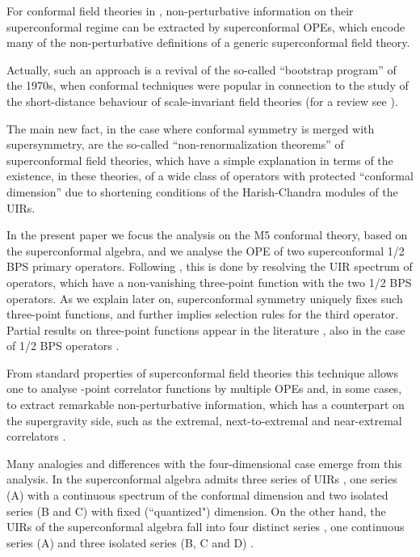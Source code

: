 \documentclass[a4paper,11pt]{article}
\begin{document}
For conformal field theories in \coordHE{}, non-perturbative information on
their superconformal regime can be extracted by superconformal OPEs,
which encode many of the non-perturbative definitions of a generic
superconformal field theory.

Actually, such an approach is a revival of the so-called ``bootstrap program''
of the 1970s, when conformal techniques were popular in connection to the study
of the short-distance behaviour of scale-invariant field theories (for a review
see \cite{Pisa}).

The main new fact, in the case where conformal symmetry is merged with
supersymmetry, are the so-called ``non-renormalization theorems'' of
superconformal field theories, which have a simple explanation in terms of the
existence, in these theories, of a wide class of operators with protected
``conformal dimension'' due to shortening conditions \cite{FF,dp,Minw2} of
the Harish-Chandra modules \cite{HCh,FeFo} of the UIRs.

In the present paper we focus the analysis on the M5 \coordHE{}
conformal theory, based on the \coordHE{}
superconformal algebra, and we analyse the OPE of two
superconformal 1/2 BPS primary operators. Following \cite{AES,ES},
this is done by resolving the UIR spectrum of operators, which
have a non-vanishing three-point function with the two 1/2 BPS
operators. As we explain later on, superconformal symmetry
uniquely fixes such three-point functions, and further implies
selection rules for the third operator. Partial results on \coordHE{}  \coordHE{} three-point functions appear in the literature \cite{P6},
also in the case of 1/2 BPS operators \cite{DHref38}.

{}From standard properties of superconformal field theories this
technique allows one to analyse \coordHE{}-point correlator functions by
multiple OPEs and, in some cases, to extract remarkable
non-perturbative information, which has a counterpart on the
supergravity side, such as the extremal, next-to-extremal and
near-extremal correlators
\cite{DHoFrMaMaRa,DHoFrMaMaRa1,D'Hoker:2000dm,DP}.

Many analogies and differences with the four-dimensional case
emerge from this analysis. In \coordHE{} the superconformal algebra
\coordHE{} admits three series of UIRs \cite{dp}, one
series (A) with a continuous spectrum of the conformal dimension
and two isolated series (B and C) with fixed (``quantized")
dimension. On the other hand, the UIRs of the \coordHE{} superconformal
algebra \coordHE{} fall into four distinct series
\cite{Minw2}, one continuous series (A) and three isolated series
(B, C and D) \cite{FS2,FS1}.
\end{document}
